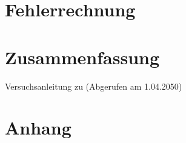 \documentclass[
12pt,
a4paper,
bibliography=totocnumbered, %
BCOR=1cm, %
oneside, %
]{scrartcl}
\begin{document}
\section{Fehlerrechnung}

\section{Zusammenfassung}


\begin{thebibliography}{999}
	 Versuchsanleitung zu (Abgerufen am 1.04.2050)
\end{thebibliography}


\section{Anhang}


\end{document}
